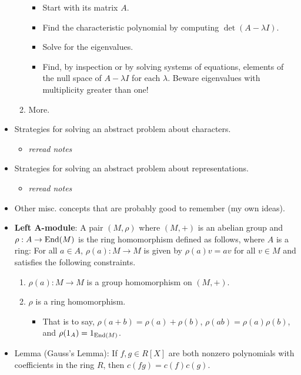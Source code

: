 \documentclass[../notes.tex]{subfiles}
\begin{document}
\begin{itemize}
\begin{enumerate}
\begin{itemize}
            \item Start with its matrix $A$.
            \item Find the characteristic polynomial by computing $\det(A-\lambda I)$.
            \item Solve for the eigenvalues.
            \item Find, by inspection or by solving systems of equations, elements of the null space of $A-\lambda I$ for each $\lambda$. Beware eigenvalues with multiplicity greater than one!
        \end{itemize}
        \item More.
    \end{enumerate}
    \item Strategies for solving an abstract problem about characters.
    \begin{itemize}
        \item \emph{reread notes}
    \end{itemize}
    \item Strategies for solving an abstract problem about representations.
    \begin{itemize}
        \item \emph{reread notes}
    \end{itemize}
    \item Other misc. concepts that are probably good to remember (my own ideas).
    \item \textbf{Left $\bm{A}$-module}: A pair $(M,\rho)$ where $(M,+)$ is an abelian group and $\rho:A\to\operatorname{End}(M)$ is the ring homomorphism defined as follows, where $A$ is a ring: For all $a\in A$, $\rho(a):M\to M$ is given by $\rho(a)v=av$ for all $v\in M$ and satisfies the following constraints.
    \begin{enumerate}
        \item $\rho(a):M\to M$ is a group homomorphism on $(M,+)$.
        \item $\rho$ is a ring homomorphism.
        \begin{itemize}
            \item That is to say, $\rho(a+b)=\rho(a)+\rho(b)$, $\rho(ab)=\rho(a)\rho(b)$, and $\rho(1_A)=1_{\operatorname{End}(M)}$.
        \end{itemize}
    \end{enumerate}
    \item Lemma (Gauss's Lemma): If $f,g\in R[X]$ are both nonzero polynomials with coefficients in the ring $R$, then $c(fg)=c(f)c(g)$.
    \begin{itemize}

\end{itemize}
\end{itemize}
\end{document}
